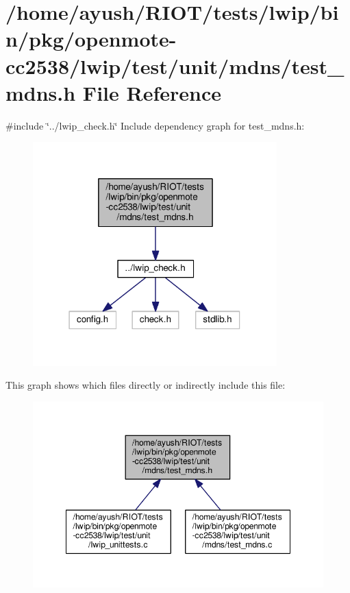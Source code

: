 \hypertarget{openmote-cc2538_2lwip_2test_2unit_2mdns_2test__mdns_8h}{}\section{/home/ayush/\+R\+I\+O\+T/tests/lwip/bin/pkg/openmote-\/cc2538/lwip/test/unit/mdns/test\+\_\+mdns.h File Reference}
\label{openmote-cc2538_2lwip_2test_2unit_2mdns_2test__mdns_8h}
{\ttfamily \#include \char`\"{}../lwip\+\_\+check.\+h\char`\"{}}\newline
Include dependency graph for test\+\_\+mdns.\+h\+:
\nopagebreak
\begin{figure}[H]
\begin{center}
\leavevmode
\includegraphics[width=267pt]{openmote-cc2538_2lwip_2test_2unit_2mdns_2test__mdns_8h__incl}
\end{center}
\end{figure}
This graph shows which files directly or indirectly include this file\+:
\nopagebreak
\begin{figure}[H]
\begin{center}
\leavevmode
\includegraphics[width=348pt]{openmote-cc2538_2lwip_2test_2unit_2mdns_2test__mdns_8h__dep__incl}
\end{center}
\end{figure}
